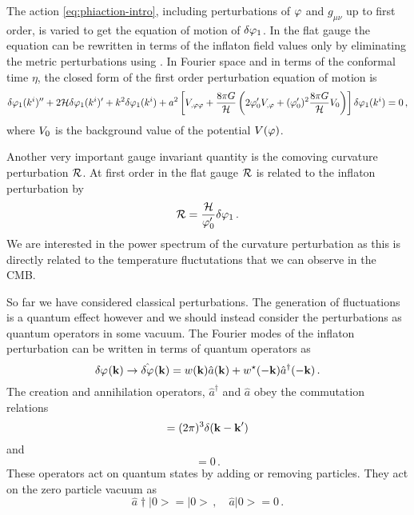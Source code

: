 The action \eqref{eq:phiaction-intro},
including perturbations of $\varphi$ and $g_{\mu\nu}$ up to first order, is
varied to get the equation of motion of $\delta\varphi_{1}$. 
In the flat gauge the equation can be rewritten in terms of the inflaton field
values only by eliminating the metric perturbations using
. 
% 
In Fourier space and in terms of the conformal time $\eta$, the closed form of
the first order perturbation equation of motion is
% 
\begin{equation}
\label{eq:fokg-intro}
 \delta\varphi_{1}(k^i)'' + 2\mathcal{H} \delta\varphi_{1}(k^i)' + k^2\delta\varphi_{1}(k^i) + a^2 \left[V_{,\varphi\varphi} +
\frac{8\pi G}{\mathcal{H}}\left(2\varphi_{0}' V_{,\varphi} + (\varphi_{0}')^2\frac{8\pi G
}{\mathcal{H}}V_{0}\right)\right]\delta\varphi_{1}(k^i) = 0 \,,
\end{equation}
% 
where $V_{0}$ is the background value of the potential $V(\varphi)$.


Another very important gauge invariant quantity is the comoving curvature
perturbation $\mathcal{R}$. At first order in the flat gauge $\mathcal{R}$ is related to the
inflaton perturbation by
% 
\begin{equation}
\label{eq:flatRdefn-intro}
 \mathcal{R} = \frac{\mathcal{H}}{\varphi_0'}\delta\varphi_{1}\,.
\end{equation}
% 
We are interested in the power spectrum of the curvature perturbation as this
is directly related to the temperature fluctutations that we can observe in the
CMB. 


So far we have considered classical perturbations. The generation of
fluctuations is a quantum effect however and we should instead consider the
perturbations as quantum operators in some vacuum. The Fourier modes of
the inflaton perturbation can be written in terms of quantum operators as
% 
\begin{equation}
 \delta\varphi_{}(\textbf{k})\rightarrow\hat{\delta\varphi_{}}(\textbf{k}) = 
  w(\textbf{k}) \hat{a}(\textbf{k}) + w^\star(-\textbf{k})\hat{a}^\dagger(-\textbf{k}) \,.
\end{equation}
%
The creation and annihilation operators, $\hat{a}^\dagger$ and $\hat{a}$ obey
the commutation relations
% 
\begin{equation}
 [\hat{a}(\kb), \hat{a}^\dagger(\kb')] = (2\pi)^3 \delta(\kb -\kb') \\
\end{equation}
and
\begin{equation}
[\hat{a}(\kb), \hat{a}(\kb')] = 0\,.
\end{equation}
% 
These operators act on quantum states by adding or removing particles. They
act on the zero particle vacuum as
% 
\begin{equation}
 \hat{a}\dagger|0> = |0>\,,\quad \hat{a}|0> = 0\,.
\end{equation}

